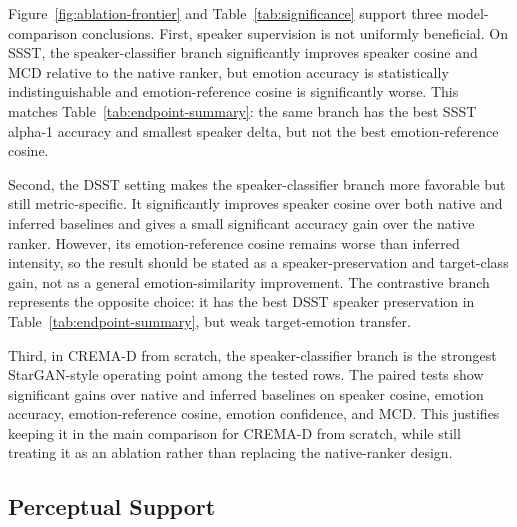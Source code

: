Figure~\ref{fig:ablation-frontier} and Table~\ref{tab:significance} support three model-comparison conclusions.
First, speaker supervision is not uniformly beneficial.
On SSST, the speaker-classifier branch significantly improves speaker cosine and MCD relative to the native ranker, but emotion accuracy is statistically indistinguishable and emotion-reference cosine is significantly worse.
This matches Table~\ref{tab:endpoint-summary}: the same branch has the best SSST alpha-1 accuracy and smallest speaker delta, but not the best emotion-reference cosine.

Second, the DSST setting makes the speaker-classifier branch more favorable but still metric-specific.
It significantly improves speaker cosine over both native and inferred baselines and gives a small significant accuracy gain over the native ranker.
However, its emotion-reference cosine remains worse than inferred intensity, so the result should be stated as a speaker-preservation and target-class gain, not as a general emotion-similarity improvement.
The contrastive branch represents the opposite choice: it has the best DSST speaker preservation in Table~\ref{tab:endpoint-summary}, but weak target-emotion transfer.

Third, in CREMA-D from scratch, the speaker-classifier branch is the strongest StarGAN-style operating point among the tested rows.
The paired tests show significant gains over native and inferred baselines on speaker cosine, emotion accuracy, emotion-reference cosine, emotion confidence, and MCD.
This justifies keeping it in the main comparison for CREMA-D from scratch, while still treating it as an ablation rather than replacing the native-ranker design.

\subsection{Perceptual Support}

\begin{table}[t]
\caption{Subjective listening-study scores for StarGANv2-NEVC on ESD SSST. Scores use a 1--5 scale. Nat. is naturalness, Emo. sim. is perceived emotion similarity, and Spk. sim. is perceived source-speaker similarity.}
\label{tab:listening-study}
\centering
\footnotesize
{}
\end{table}

